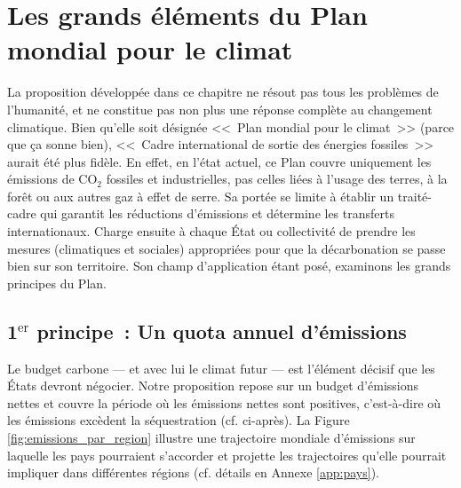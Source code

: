 \documentclass[a5paper,french,openany]{memoir}
\begin{document}
\chapter{Les grands éléments du Plan mondial pour le climat\label{ch:principes}}

La proposition développée dans ce chapitre ne résout pas tous les problèmes de l'humanité, et ne constitue pas non plus une réponse complète au changement climatique. Bien qu'elle soit désignée <<~Plan mondial pour le climat~>> (parce que ça sonne bien), <<~Cadre international de sortie des énergies fossiles~>> aurait été plus fidèle.  %
En effet, en l'état actuel, ce Plan couvre uniquement les émissions de CO$_\text{2}$ fossiles et industrielles, pas celles liées à l'usage des terres, à la forêt ou aux autres gaz à effet de serre. %
Sa portée se limite à établir un traité-cadre qui garantit les réductions d'émissions et détermine les transferts internationaux. Charge ensuite à chaque État ou collectivité de prendre les mesures (climatiques et sociales) appropriées pour que la décarbonation se passe bien sur son territoire. Son champ d'application étant posé, %
examinons les grands principes du Plan.

\section{1$^\text{er}$ principe~: Un quota annuel d'émissions}\label{sec:pcp_quota}

Le budget carbone --- et avec lui le climat futur --- est l'élément décisif que les États devront négocier. 
Notre proposition repose sur un budget d'émissions nettes et couvre la période où les émissions nettes sont positives, c'est-à-dire où les émissions excèdent la séquestration (cf. ci-après). La Figure \ref{fig:emissions_par_region} illustre une trajectoire mondiale d'émissions sur laquelle les pays pourraient s'accorder et projette les trajectoires qu'elle pourrait impliquer dans différentes régions (cf. détails en Annexe \ref{app:pays}). 
\end{document}
